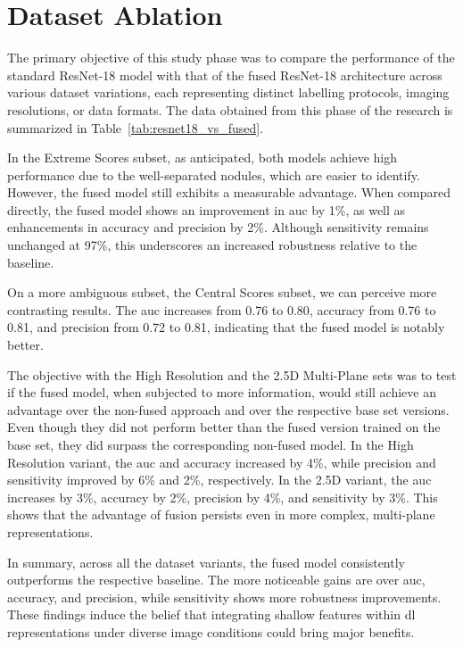 \FloatBarrier

\section{Dataset Ablation}

The primary objective of this study phase was to compare the performance of the standard ResNet-18 model with that of the fused ResNet-18 architecture across various dataset variations, each representing distinct labelling protocols, imaging resolutions, or data formats. The data obtained from this phase of the research is summarized in Table~\ref{tab:resnet18_vs_fused}.

In the Extreme Scores subset, as anticipated, both models achieve high performance due to the well-separated nodules, which are easier to identify. However, the fused model still exhibits a measurable advantage. When compared directly, the fused model shows an improvement in \ac{auc} by 1\%, as well as enhancements in accuracy and precision by 2\%. Although sensitivity remains unchanged at 97\%, this underscores an increased robustness relative to the baseline.

On a more ambiguous subset, the Central Scores subset, we can perceive more contrasting results. The \ac{auc} increases from 0.76 to 0.80, accuracy from 0.76 to 0.81, and precision from 0.72 to 0.81, indicating that the fused model is notably better.

The objective with the High Resolution and the 2.5D Multi-Plane sets was to test if the fused model, when subjected to more information, would still achieve an advantage over the non-fused approach and over the respective base set versions.
Even though they did not perform better than the fused version trained on the base set, they did surpass the corresponding non-fused model. In the High Resolution variant, the \ac{auc} and accuracy increased by 4\%, while precision and sensitivity improved by 6\% and 2\%, respectively. In the 2.5D variant, the \ac{auc} increases by 3\%, accuracy by 2\%, precision by 4\%, and sensitivity by 3\%. This shows that the advantage of fusion persists even in more complex, multi-plane representations.

In summary, across all the dataset variants, the fused model consistently outperforms the respective baseline. The more noticeable gains are over \ac{auc}, accuracy, and precision, while sensitivity shows more robustness improvements.
These findings induce the belief that integrating shallow features within \ac{dl} representations under diverse image conditions could bring major benefits.

